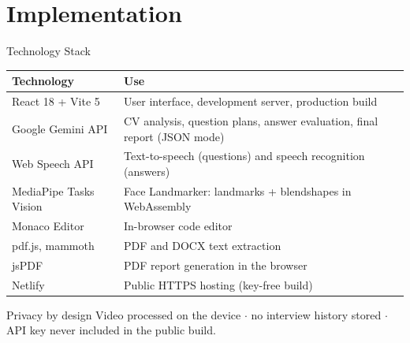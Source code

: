 \documentclass[aspectratio=169,11pt,xcolor=table]{beamer}
\begin{document}
\section{Implementation}
\begin{frame}{Technology Stack}
  \small
  \begin{tabularx}{\textwidth}{@{}lY@{}}
    \toprule
    \textbf{Technology} & \textbf{Use} \\
    \midrule
    React 18 + Vite 5 & User interface, development server, production build \\
    Google Gemini API & CV analysis, question plans, answer evaluation, final report (JSON mode) \\
    Web Speech API & Text-to-speech (questions) and speech recognition (answers) \\
    MediaPipe Tasks Vision & Face Landmarker: landmarks + blendshapes in WebAssembly \\
    Monaco Editor & In-browser code editor \\
    pdf.js, mammoth & PDF and DOCX text extraction \\
    jsPDF & PDF report generation in the browser \\
    Netlify & Public HTTPS hosting (key-free build) \\
    \bottomrule
  \end{tabularx}
  \vspace{0.3cm}
  \begin{exampleblock}{Privacy by design}
    Video processed on the device $\cdot$ no interview history stored $\cdot$ API key never included in the public build.
  \end{exampleblock}
\end{frame}

\end{document}
